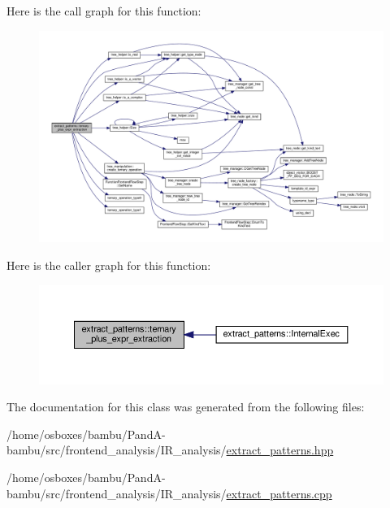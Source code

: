 Here is the call graph for this function\+:
\nopagebreak
\begin{figure}[H]
\begin{center}
\leavevmode
\includegraphics[width=350pt]{d6/db8/classextract__patterns_aa8360e2e8d2a377b8d0938d9c50c6771_cgraph}
\end{center}
\end{figure}
Here is the caller graph for this function\+:
\nopagebreak
\begin{figure}[H]
\begin{center}
\leavevmode
\includegraphics[width=350pt]{d6/db8/classextract__patterns_aa8360e2e8d2a377b8d0938d9c50c6771_icgraph}
\end{center}
\end{figure}


The documentation for this class was generated from the following files\+:\begin{DoxyCompactItemize}
\item 
/home/osboxes/bambu/\+Pand\+A-\/bambu/src/frontend\+\_\+analysis/\+I\+R\+\_\+analysis/\hyperlink{extract__patterns_8hpp}{extract\+\_\+patterns.\+hpp}\item 
/home/osboxes/bambu/\+Pand\+A-\/bambu/src/frontend\+\_\+analysis/\+I\+R\+\_\+analysis/\hyperlink{extract__patterns_8cpp}{extract\+\_\+patterns.\+cpp}\end{DoxyCompactItemize}
